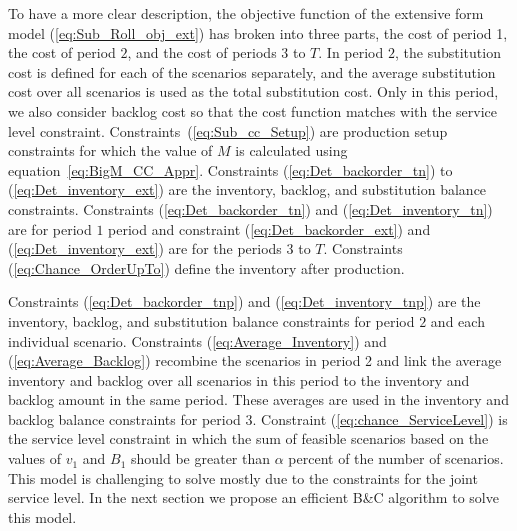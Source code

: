 \documentclass[11pt]{article}
\newcommand{\ti}{t} %
\newcommand{\TI}{\mathcal{T}}
\newcommand{\Ti}{T}
\newcommand{\ka}{k} %
\newcommand{\KA}{\mathcal{K}}
\newcommand{\jey}{j} %
\newcommand{\Vi}{v} %
\newcommand{\m}{\omega} %
\newcommand{\EM}{\Omega} %
\newcommand{\Csub}{\mathcal{K}^+_k}
\newcommand{\cred}{\color{black}}
\begin{document}
To have a more clear description, the objective function of the extensive form model (\ref{eq:Sub_Roll_obj_ext}) has broken into three parts, the cost of period 1, the cost of period $2$, and the cost of periods $3$ to $\Ti$. In period $2$, the substitution cost is defined for each of the scenarios separately, and the average substitution cost over all scenarios is used as the total substitution cost. {\cred Only in this period, we also consider backlog cost so that the cost function matches with the service level constraint.} 
Constraints~(\ref{eq:Sub_cc_Setup}) are production setup constraints for which the value of $M$ is calculated using equation~\ref{eq:BigM_CC_Appr}. Constraints (\ref{eq:Det_backorder_tn}) to (\ref{eq:Det_inventory_ext}) are the inventory, backlog, and substitution balance constraints.
Constraints (\ref{eq:Det_backorder_tn}) and (\ref{eq:Det_inventory_tn}) are for period $1$ period and constraint (\ref{eq:Det_backorder_ext}) and (\ref{eq:Det_inventory_ext}) are for the periods $3$ to $\Ti$.  Constraints (\ref{eq:Chance_OrderUpTo}) define the inventory after production.
 
 
 
 {\cred{
\begin{alignat}{2}
  &  M_{\ti \ka} =  \sum_{\jey \in  \Csub}\left( \hat{B}_{0 \jey}+  {\hat{D}}_{1 \jey} + \max_{\m \in \EM} {D}^{\m}_{2 \jey}+ \sum_{\ti =3}^\Ti \mathbb{E}[{D}_{\ti \jey}]\right)  &&\qquad \forall \ti \in \TI ,\forall \ka \in \KA   
  \label{eq:BigM_CC_Appr}
  \end{alignat}}}
 
Constraints (\ref{eq:Det_backorder_tnp}) and (\ref{eq:Det_inventory_tnp}) are the inventory, backlog, and substitution balance constraints for period $2$ and each individual scenario.  
Constraints (\ref{eq:Average_Inventory}) and (\ref{eq:Average_Backlog}) recombine the scenarios in period 2 and link the average inventory and backlog over all scenarios in this period to the inventory and backlog amount in the same period. These averages are used in the inventory and backlog balance constraints for period $3$.
Constraint (\ref{eq:chance_ServiceLevel}) is the service level constraint in which the sum of feasible scenarios based on the values of $\Vi_1$ and $B_1$ should be greater than $\alpha$ percent of the number of scenarios. This model is challenging to solve mostly due to the constraints for the joint service level. In the next section we propose an efficient B\&C algorithm to solve this model.\\
\end{document}
